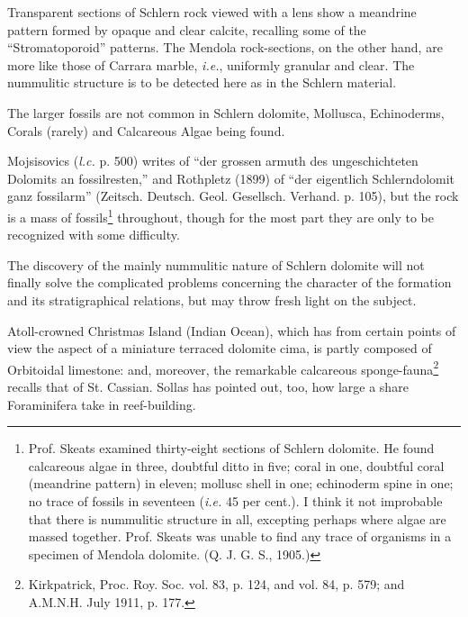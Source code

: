 \documentclass[a4paper, 12pt, oneside]{article}
\begin{document}
Transparent sections of Schlern rock viewed with a lens show a meandrine pattern formed by opaque and clear calcite, recalling some of the ``Stromatoporoid'' patterns. The Mendola rock-sections, on the other hand, are more like those of Carrara marble, \emph{i.e.}, uniformly granular and clear. The nummulitic structure is to be detected here as in the Schlern material.

The larger fossils are not common in Schlern dolomite, Mollusca, Echinoderms, Corals (rarely) and Calcareous Algae being found.

Mojsisovics (\emph{l.c.} p. 500) writes of ``der grossen armuth des ungeschichteten Dolomits an fossilresten,'' and Rothpletz (1899) of ``der eigentlich Schlerndolomit ganz fossilarm'' (Zeitsch. Deutsch. Geol. Gesellsch. Verhand. p. 105), but the rock is a mass of fossils\footnote{Prof. Skeats examined thirty-eight sections of Schlern dolomite. He found calcareous algae in three, doubtful ditto in five; coral in one, doubtful coral (meandrine pattern) in eleven; mollusc shell in one; echinoderm spine in one; no trace of fossils in seventeen (\emph{i.e.} 45 per cent.). I think it not improbable that there is nummulitic structure in all, excepting perhaps where algae are massed together. Prof. Skeats was unable to find any trace of organisms in a specimen of Mendola dolomite. (Q. J. G. S., 1905.)} throughout, though for the most part they are only to be recognized with some difficulty.

The discovery of the mainly nummulitic nature of Schlern dolomite will not finally solve the complicated problems concerning the character of the formation and its stratigraphical relations, but may throw fresh light on the subject.

Atoll-crowned Christmas Island (Indian Ocean), which has from certain points of view the aspect of a miniature terraced dolomite cima, is partly composed of Orbitoidal limestone: and, moreover, the remarkable calcareous sponge-fauna\footnote{Kirkpatrick, Proc. Roy. Soc. vol. 83, p. 124, and vol. 84, p. 579; and A.M.N.H. July 1911, p. 177.} recalls that of St. Cassian. Sollas has pointed out, too, how large a share Foraminifera take in reef-building.
\end{document}
